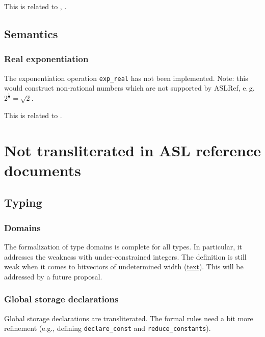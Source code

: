 \documentclass{book}
\begin{document}
This is related to , .

\section{Semantics}

\subsection{Real exponentiation}

The exponentiation operation \texttt{exp\_real} has not been implemented.
%
Note: this would construct non-rational numbers which are not supported by
ASLRef, e.\,g.\ $2^\frac{1}{2} = \sqrt{2}$.

This is related to .


\chapter{Not transliterated in ASL reference documents}

\section{Typing}

\subsection{Domains}

The formalization of type domains is complete for all types.
In particular, it addresses the weakness with under-constrained integers.
The definition is still weak when it comes to bitvectors of undetermined width (\url{text}).
This will be addressed by a future proposal.

\subsection{Global storage declarations}

Global storage declarations are transliterated.
The formal rules need a bit more refinement (e.g., defining \texttt{declare\_const} and \texttt{reduce\_constants}).
\end{document}
